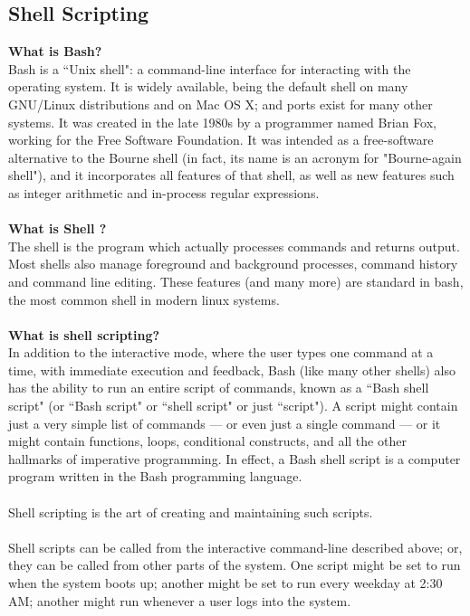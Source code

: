 \subsection{Shell Scripting}
{\bf What is Bash?}\\
Bash is a ``Unix shell": a command-line interface for interacting with the operating system. It is widely available, being the default shell on many GNU/Linux distributions and on Mac OS X; and ports exist for many other systems. It was created in the late 1980s by a programmer named Brian Fox, working for the Free Software Foundation. It was intended as a free-software alternative to the Bourne shell (in fact, its name is an acronym for "Bourne-again shell"), and it incorporates all features of that shell, as well as new features such as integer arithmetic and in-process regular expressions.\\\\
{\bf What is Shell ?}\\
The shell is the program which actually processes commands and returns output. Most shells also manage foreground and background processes, command history and command line editing. These features (and many more) are standard in bash, the most common shell in modern linux systems.\\\\
{\bf What is shell scripting?}\\
In addition to the interactive mode, where the user types one command at a time, with immediate execution and feedback, Bash (like many other shells) also has the ability to run an entire script of commands, known as a ``Bash shell script" (or ``Bash script" or ``shell script" or just ``script"). A script might contain just a very simple list of commands — or even just a single command — or it might contain functions, loops, conditional constructs, and all the other hallmarks of imperative programming. In effect, a Bash shell script is a computer program written in the Bash programming language.\\\\
Shell scripting is the art of creating and maintaining such scripts.\\\\
Shell scripts can be called from the interactive command-line described above; or, they can be called from other parts of the system. One script might be set to run when the system boots up; another might be set to run every weekday at 2:30 AM; another might run whenever a user logs into the system.\\\\
